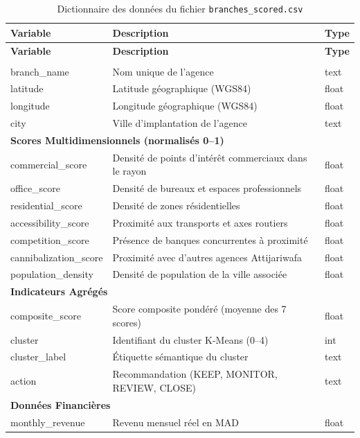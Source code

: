\documentclass[11pt,a4paper,twoside]{report}
\begin{document}
\begin{center}
\small
\renewcommand{\arraystretch}{1.15}
\begin{longtable}{|p{4.2cm}|p{6.5cm}|p{2.3cm}|}
\caption{Dictionnaire des données du fichier \texttt{branches\_scored.csv}} \label{tab:dict_branches} \\
\hline
\textbf{Variable} & \textbf{Description} & \textbf{Type} \\
\hline
\endfirsthead
\hline
\textbf{Variable} & \textbf{Description} & \textbf{Type} \\
\hline
\endhead
\hline
\endfoot
\hline
\endlastfoot

\multicolumn{3}{|l|}{\textbf{Identification}} \\
\hline
branch\_name & Nom unique de l'agence & text \\
\hline
latitude & Latitude géographique (WGS84) & float \\
\hline
longitude & Longitude géographique (WGS84) & float \\
\hline
city & Ville d'implantation de l'agence & text \\
\hline

\multicolumn{3}{|l|}{\textbf{Scores Multidimensionnels (normalisés 0--1)}} \\
\hline
commercial\_score & Densité de points d'intérêt commerciaux dans le rayon & float \\
\hline
office\_score & Densité de bureaux et espaces professionnels & float \\
\hline
residential\_score & Densité de zones résidentielles & float \\
\hline
accessibility\_score & Proximité aux transports et axes routiers & float \\
\hline
competition\_score & Présence de banques concurrentes à proximité & float \\
\hline
cannibalization\_score & Proximité avec d'autres agences Attijariwafa & float \\
\hline
population\_density & Densité de population de la ville associée & float \\
\hline

\multicolumn{3}{|l|}{\textbf{Indicateurs Agrégés}} \\
\hline
composite\_score & Score composite pondéré (moyenne des 7 scores) & float \\
\hline
cluster & Identifiant du cluster K-Means (0--4) & int \\
\hline
cluster\_label & Étiquette sémantique du cluster & text \\
\hline
action & Recommandation (KEEP, MONITOR, REVIEW, CLOSE) & text \\
\hline

\multicolumn{3}{|l|}{\textbf{Données Financières}} \\
\hline
monthly\_revenue & Revenu mensuel réel en MAD & float \\
\hline

\end{longtable}
\end{center}
\end{document}
